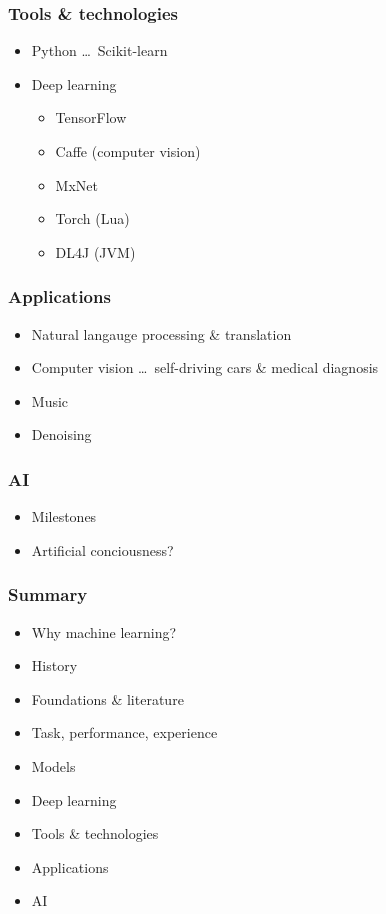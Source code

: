\documentclass[xcolor={dvipsnames}]{beamer}
\begin{document}
\begin{frame}
  \frametitle{Tools \& technologies}
  \begin{itemize}
    \item<+-> Python \ldots\ Scikit-learn
    \item<+-> Deep learning
      \begin{itemize}
        \item TensorFlow
        \item Caffe (computer vision)
        \item MxNet
        \item Torch (Lua)
        \item DL4J (JVM)
      \end{itemize}
  \end{itemize}
\end{frame}

\begin{frame}
  \frametitle{Applications}
  \begin{itemize}
    \item<+-> Natural langauge processing \& translation
    \item<+-> Computer vision \ldots\ self-driving cars \& medical diagnosis
    \item<+-> Music
    \item<+-> Denoising
  \end{itemize}
\end{frame}

\begin{frame}
  \frametitle{AI}
  \begin{itemize}
    \item Milestones
    \item Artificial conciousness?
  \end{itemize}
\end{frame}

\begin{frame}
  \frametitle{Summary}
  \begin{itemize}
    \item Why machine learning?
    \item History
    \item Foundations \& literature
    \item Task, performance, experience
    \item Models
    \item Deep learning
    \item Tools \& technologies
    \item Applications
    \item AI
  \end{itemize}
\end{frame}
\end{document}

